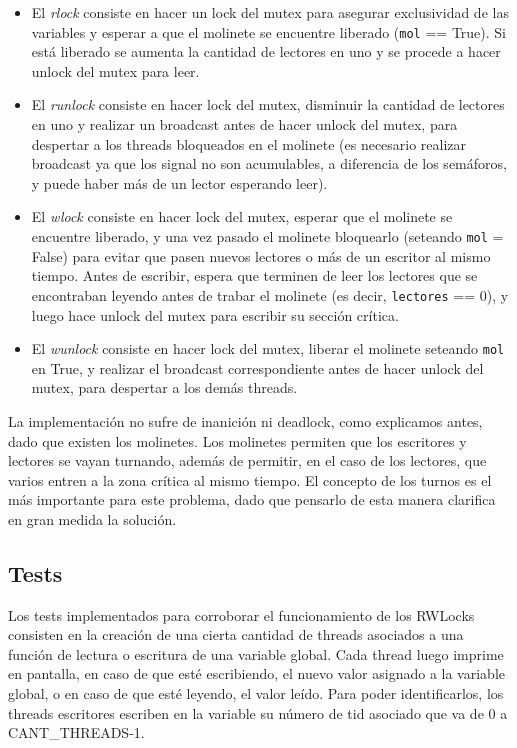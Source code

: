 \begin{itemize}
\item {El \emph{rlock} consiste en hacer un lock del mutex para asegurar exclusividad de las variables y esperar a que el molinete se encuentre liberado (\texttt{mol} == True). Si está liberado se aumenta la cantidad de lectores en uno y se procede a hacer unlock del mutex para leer.}
\item{El \emph{runlock} consiste en hacer lock del mutex, disminuir la cantidad de lectores en uno y realizar un broadcast antes de hacer unlock del mutex, para despertar a los threads bloqueados en el molinete (es necesario realizar broadcast ya que los signal no son acumulables, a diferencia de los semáforos, y puede haber más de un lector esperando leer).}
\item{El \emph{wlock} consiste en hacer lock del mutex, esperar que el molinete se encuentre liberado, y una vez pasado el molinete bloquearlo (seteando \texttt{mol} = False) para evitar que pasen nuevos lectores o más de un escritor al mismo tiempo. Antes de escribir, espera que terminen de leer los lectores que se encontraban leyendo antes de trabar el molinete (es decir, \texttt{lectores} == 0), y luego hace unlock del mutex para escribir su sección crítica.}
\item{El \emph{wunlock} consiste en hacer lock del mutex, liberar el molinete seteando \texttt{mol} en True, y realizar el broadcast correspondiente antes de hacer unlock del mutex, para despertar a los demás threads.}
\end{itemize}

\par La implementación no sufre de inanición ni deadlock, como explicamos antes, dado que existen los molinetes. Los molinetes permiten que los escritores y lectores se vayan turnando, además de permitir, en el caso de los lectores, que varios entren a la zona crítica al mismo tiempo. El concepto de los turnos es el más importante para este problema, dado que pensarlo de esta manera clarifica en gran medida la solución.


\subsection{Tests}

\par Los tests implementados para corroborar el funcionamiento de los RWLocks consisten en la creación de una cierta cantidad de threads asociados a una función de lectura o escritura de una variable global. Cada thread luego imprime en pantalla, en caso de que esté escribiendo, el nuevo valor asignado a la variable global, o en caso de que esté leyendo, el valor leído. Para poder identificarlos, los threads escritores escriben en la variable su número de tid asociado que va de 0 a CANT\_THREADS-1. 

